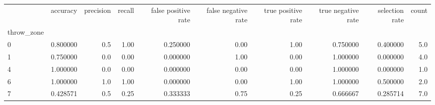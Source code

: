 \begin{tabular}{lrrrrrrrrr}
\toprule
{} &  accuracy &  precision &  recall &  false positive rate &  false negative rate &  true positive rate &  true negative rate &  selection rate &  count \\
throw\_zone &           &            &         &                      &                      &                     &                     &                 &        \\
\midrule
0          &  0.800000 &        0.5 &    1.00 &             0.250000 &                 0.00 &                1.00 &            0.750000 &        0.400000 &    5.0 \\
1          &  0.750000 &        0.0 &    0.00 &             0.000000 &                 1.00 &                0.00 &            1.000000 &        0.000000 &    4.0 \\
4          &  1.000000 &        0.0 &    0.00 &             0.000000 &                 0.00 &                0.00 &            1.000000 &        0.000000 &    1.0 \\
6          &  1.000000 &        1.0 &    1.00 &             0.000000 &                 0.00 &                1.00 &            1.000000 &        0.500000 &    2.0 \\
7          &  0.428571 &        0.5 &    0.25 &             0.333333 &                 0.75 &                0.25 &            0.666667 &        0.285714 &    7.0 \\
\bottomrule
\end{tabular}
